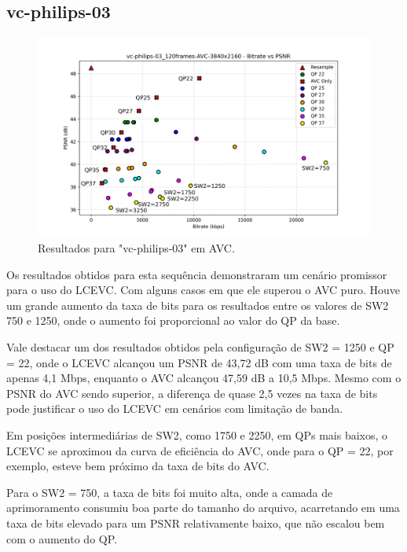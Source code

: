 \newpage

\subsection{vc-philips-03}

\begin{figure}[h]
    \centering
    \includegraphics[width=1.0\textwidth]{img/vc-philips-03_120frames-AVC.png}
    \caption{Resultados para "vc-philips-03" em \acrshort{AVC}.}
    \label{fig:vc-philips-03}
\end{figure}

Os resultados obtidos para esta sequência demonstraram um cenário promissor para
o uso do \acrshort{LCEVC}. Com alguns casos em que ele superou o \acrshort{AVC} puro.
Houve um grande aumento da taxa de bits para os resultados entre os valores de SW2
750 e 1250, onde o aumento foi proporcional ao valor do QP da base.

Vale destacar um dos resultados obtidos pela configuração de SW2 = 1250 e QP = 22, onde
o \acrshort{LCEVC} alcançou um \acrshort{PSNR} de 43,72 dB com uma taxa de bits
de apenas 4,1 Mbps, enquanto o \acrshort{AVC} alcançou 47,59 dB a 10,5 Mbps. Mesmo
com o \acrshort{PSNR} do \acrshort{AVC} sendo superior, a diferença de quase 2,5 vezes
na taxa de bits pode justificar o uso do \acrshort{LCEVC} em cenários com limitação
de banda.

Em posições intermediárias de SW2, como 1750 e 2250, em QPs mais baixos, o \acrshort{LCEVC}
se aproximou da curva de eficiência do \acrshort{AVC}, onde para o QP = 22,
por exemplo, esteve bem próximo da taxa de bits do \acrshort{AVC}.

Para o SW2 = 750, a taxa de bits foi muito alta, onde a camada de aprimoramento
consumiu boa parte do tamanho do arquivo, acarretando em uma taxa de bits elevado para um
\acrshort{PSNR} relativamente baixo, que não escalou bem com o aumento do QP.

